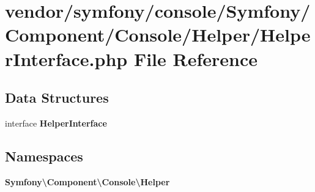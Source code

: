 \section{vendor/symfony/console/\+Symfony/\+Component/\+Console/\+Helper/\+Helper\+Interface.php File Reference}
\label{_helper_interface_8php}
\subsection*{Data Structures}
\begin{DoxyCompactItemize}
\item 
interface {\bf Helper\+Interface}
\end{DoxyCompactItemize}
\subsection*{Namespaces}
\begin{DoxyCompactItemize}
\item 
 {\bf Symfony\textbackslash{}\+Component\textbackslash{}\+Console\textbackslash{}\+Helper}
\end{DoxyCompactItemize}
